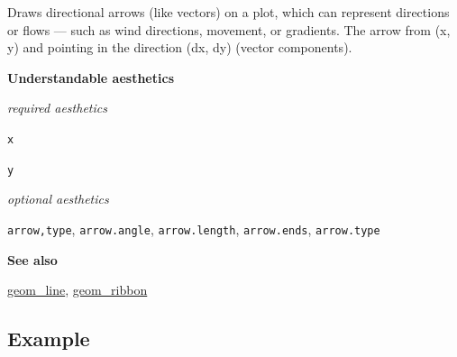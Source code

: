 \documentclass[
  letterpaper,
  DIV=11,
  numbers=noendperiod]{scrreprt}
\begin{document}
Draws directional arrows (like vectors) on a plot, which can represent
directions or flows --- such as wind directions, movement, or gradients.
The arrow from (x, y) and pointing in the direction (dx, dy) (vector
components).

\textbf{Understandable aesthetics}

\emph{required aesthetics}

\texttt{x}

\texttt{y}

\emph{optional aesthetics}

\texttt{arrow,type}, \texttt{arrow.angle}, \texttt{arrow.length},
\texttt{arrow.ends}, \texttt{arrow.type}

\textbf{See also}

\hyperref[line]{geom\_line}, \hyperref[ribbon]{geom\_ribbon}

\subsection{Example}\label{example}
\end{document}
